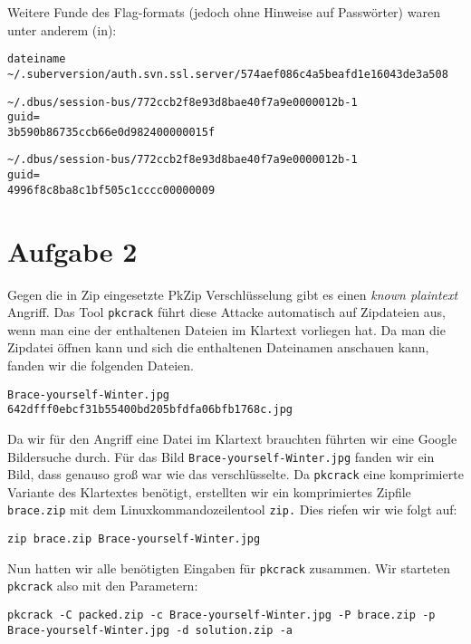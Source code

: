 \documentclass[10pt,a4paper]{article}
\begin{document}
Weitere Funde des Flag-formats (jedoch ohne Hinweise auf Passwörter) waren unter anderem (in):
\begin{verbatim}
dateiname
~/.suberversion/auth.svn.ssl.server/574aef086c4a5beafd1e16043de3a508
\end{verbatim}

\begin{verbatim}
~/.dbus/session-bus/772ccb2f8e93d8bae40f7a9e0000012b-1
guid=
3b590b86735ccb66e0d982400000015f
\end{verbatim}

\begin{verbatim}
~/.dbus/session-bus/772ccb2f8e93d8bae40f7a9e0000012b-1
guid=
4996f8c8ba8c1bf505c1cccc00000009
\end{verbatim}

\section*{Aufgabe 2}

Gegen die in Zip eingesetzte PkZip Verschlüsselung gibt es einen \textit{known plaintext} Angriff. Das Tool \texttt{pkcrack} führt diese Attacke automatisch auf Zipdateien aus, wenn man eine der enthaltenen Dateien im Klartext vorliegen hat. Da man die Zipdatei öffnen kann und sich die enthaltenen Dateinamen anschauen kann, fanden wir die folgenden Dateien.
\begin{verbatim}
Brace-yourself-Winter.jpg
642dfff0ebcf31b55400bd205bfdfa06bfb1768c.jpg
\end{verbatim}

Da wir für den Angriff eine Datei im Klartext brauchten führten wir eine Google Bildersuche durch. Für das Bild \texttt{Brace-yourself-Winter.jpg} fanden wir ein Bild, dass genauso groß war wie das verschlüsselte. Da \texttt{pkcrack} eine komprimierte Variante des Klartextes benötigt, erstellten wir ein komprimiertes Zipfile \texttt{brace.zip} mit dem Linuxkommandozeilentool \texttt{zip.} Dies riefen wir wie folgt auf:
\begin{verbatim}
zip brace.zip Brace-yourself-Winter.jpg
\end{verbatim}

Nun hatten wir alle benötigten Eingaben für \texttt{pkcrack} zusammen. Wir starteten \texttt{pkcrack} also mit den Parametern:
\begin{small}
\begin{verbatim}
pkcrack -C packed.zip -c Brace-yourself-Winter.jpg -P brace.zip -p Brace-yourself-Winter.jpg -d solution.zip -a
\end{verbatim}
\end{small}
\end{document}
